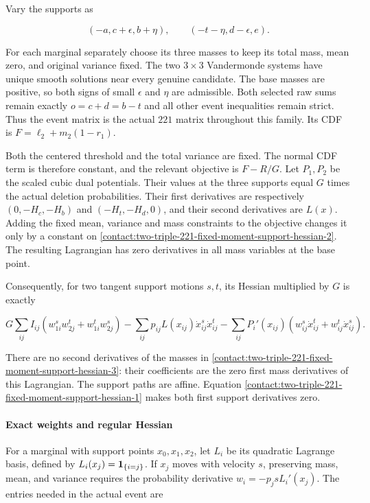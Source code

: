 Vary the supports as

\[
 (-a,c+\epsilon,b+\eta),\qquad (-t-\eta,d-\epsilon,e).
\tag{B.34.2}\label{contact:two-triple-221-fixed-moment-support-hessian-2}
\]

For each marginal separately choose its three masses to keep its total
mass, mean zero, and original variance fixed. The two $3\times3$ Vandermonde
systems have unique smooth solutions near every genuine candidate. The
base masses are positive, so both signs of small $\epsilon$ and $\eta$ are
admissible. Both selected raw sums remain exactly $o=c+d=b-t$ and all
other event inequalities remain strict. Thus the event matrix is the
actual $221$ matrix throughout this family. Its CDF is
$F=\ell_2+m_2(1-r_1)$.

Both the centered threshold and the total variance are fixed. The normal
CDF term is therefore constant, and the relevant objective is $F-R/G$.
Let $P_1,P_2$ be the scaled cubic dual potentials. Their values at the three
supports equal $G$ times the actual deletion probabilities. Their first
derivatives are respectively $(0,-H_c,-H_b)$ and $(-H_t,-H_d,0)$, and their
second derivatives are $L(x)$. Adding the fixed mean, variance and mass
constraints to the objective changes it only by a constant on \eqref{contact:two-triple-221-fixed-moment-support-hessian-2}.
The resulting Lagrangian has zero derivatives in all mass variables at
the base point.

Consequently, for two tangent support motions $s,t$, its Hessian multiplied
by $G$ is exactly

\[
 G\sum_{ij} I_{ij}(w_{1i}^{s}w_{2j}^{t}+w_{1i}^{t}w_{2j}^{s})
 -\sum_{ij}p_{ij}L(x_{ij})\dot x_{ij}^{s}\dot x_{ij}^{t}
 -\sum_{ij}P_i'(x_{ij})(w_{ij}^{s}\dot x_{ij}^{t}
                         +w_{ij}^{t}\dot x_{ij}^{s}). \tag{B.34.3}\label{contact:two-triple-221-fixed-moment-support-hessian-3}
\]

There are no second derivatives of the masses in \eqref{contact:two-triple-221-fixed-moment-support-hessian-3}: their coefficients
are the zero first mass derivatives of this Lagrangian. The support paths
are affine. Equation \eqref{contact:two-triple-221-fixed-moment-support-hessian-1} makes both first support derivatives zero.

\paragraph{Exact weights and regular Hessian}

For a marginal with support points $x_0,x_1,x_2$, let $L_i$ be its
quadratic Lagrange basis, defined by $L_i(x_j)=\mathbf 1_{\{i=j\}}$.
If $x_j$ moves with velocity $s$, preserving mass, mean, and variance
requires the probability derivative $w_i=-p_j s L_i'(x_j)$.
The entries needed in the actual event are

